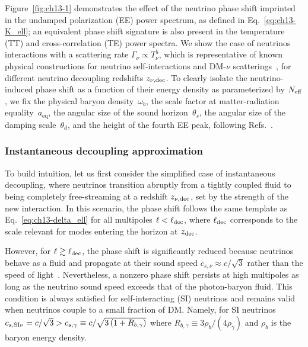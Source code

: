 Figure~\ref{fig:ch13-1} demonstrates the effect of the neutrino phase shift imprinted in the undamped polarization (EE) power spectrum, as defined in Eq.~\eqref{eq:ch13-K_ell}; an equivalent phase shift signature is also present in the temperature (TT) and cross-correlation (TE) power spectra. We show the case of neutrinos interactions with a scattering rate $\Gamma_\nu\propto T_\nu^5$, which is representative of known physical constructions for neutrino self-interactions and DM-$\nu$ scatterings~\cite{Boehm:2003hm,Wilkinson:2014ksa,Cyr-Racine:2013jua}, for different neutrino decoupling redshifts $z_{\nu,\rm dec}$.
To clearly isolate the neutrino-induced phase shift as a function of their energy density as parameterized by $N_\mathrm{eff}$, we fix the physical baryon density~$\omega_b$, the scale factor at matter-radiation equality~$a_{\mathrm{eq}}$, the angular size of the sound horizon~$\theta_s$, the angular size of the damping scale~$\theta_d$, and the height of the fourth EE peak, following Refs.~\cite{Follin:2015hya, Wallisch:2018rzj, Montefalcone:2025unv}.

\subsubsection{Instantaneous decoupling approximation}

\noindent To build intuition, let us first consider the simplified case of instantaneous decoupling, where neutrinos transition abruptly from a tightly coupled fluid to being completely free-streaming at a redshift $z_{\nu,\rm dec}$, set by the strength of the new interaction. In this scenario, the phase shift follows the same template as Eq.~\eqref{eq:ch13-delta_ell} for all multipoles $\ell < \ell_{\rm dec}$, where $\ell_{\rm dec}$ corresponds to the scale relevant for modes entering the horizon at $z_{\rm dec}$.

However, for $\ell \gtrsim \ell_{\rm dec}$, the phase shift is significantly reduced because neutrinos behave as a fluid and propagate at their sound speed $c_{s,\nu}\approx c/\sqrt{3}$ rather than the speed of light~\cite{Choi:2018gho, Loverde:2022wih}. Nevertheless, a nonzero phase shift persists at high multipoles as long as the neutrino sound speed exceeds that of the photon-baryon fluid. This condition is always satisfied for self-interacting (SI) neutrinos and remains valid when neutrinos couple to a small fraction of DM.
Namely, for SI neutrinos $c_{s,\rm SI\nu}=c/\sqrt{3}>c_{s,\gamma}\equiv c/\sqrt{3\left(1+R_{b,\gamma}\right)}$ where $R_{b,\gamma}\equiv 3\rho_b/(4\rho_\gamma)$ and $\rho_b$ is the baryon energy density.

